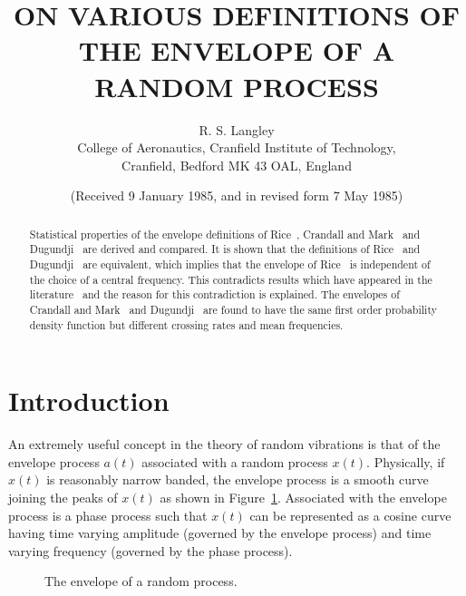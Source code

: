 \documentclass[12pt]{article}
\title{ON VARIOUS DEFINITIONS OF THE ENVELOPE OF A RANDOM PROCESS}
\author{R. S. Langley \\ College of Aeronautics, Cranfield Institute of Technology, \\ Cranfield, Bedford MK 43 OAL, England}
\date{(Received 9 January 1985, and in revised form 7 May 1985)}
\theoremstyle{plain}
\theoremstyle{definition}
\theoremstyle{remark}
\begin{document}
\maketitle

\begin{abstract}
Statistical properties of the envelope definitions of Rice~\cite{rice1954}, Crandall and Mark~\cite{crandall1963} and Dugundji~\cite{dugundji1958} are derived and compared. It is shown that the definitions of Rice~\cite{rice1954} and Dugundji~\cite{dugundji1958} are equivalent, which implies that the envelope of Rice~\cite{rice1954} is independent of the choice of a central frequency. This contradicts results which have appeared in the literature~\cite{lin1967,lin1976} and the reason for this contradiction is explained. The envelopes of Crandall and Mark~\cite{crandall1963} and Dugundji~\cite{dugundji1958} are found to have the same first order probability density function but different crossing rates and mean frequencies.
\end{abstract}

\section{Introduction}
An extremely useful concept in the theory of random vibrations is that of the envelope process $a(t)$ associated with a random process $x(t)$. Physically, if $x(t)$ is reasonably narrow banded, the envelope process is a smooth curve joining the peaks of $x(t)$ as shown in Figure~\ref{fig:envelope}. Associated with the envelope process is a phase process such that $x(t)$ can be represented as a cosine curve having time varying amplitude (governed by the envelope process) and time varying frequency (governed by the phase process).

\begin{figure}[h]
    \centering
    \caption{The envelope of a random process.}
    \label{fig:envelope}
\end{figure}
\end{document}
